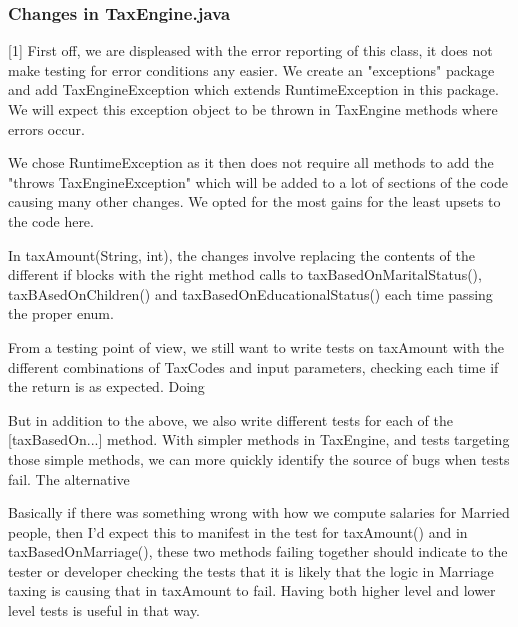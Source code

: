 \documentclass[11pt]{article}
\begin{document}
\subsubsection{Changes in TaxEngine.java}

[1] First off, we are displeased with the error reporting of this class, it does not make testing for error conditions any easier. We create an "exceptions" package and add TaxEngineException which extends RuntimeException in this package. We will expect this exception object to be thrown in TaxEngine methods where errors occur. 

We chose RuntimeException as it then does not require all methods to add the "throws TaxEngineException" which will be added to a lot of sections of the code causing many other changes. We opted for the most gains for the least upsets to the code here. 


In taxAmount(String, int), the changes involve replacing the contents of the different if blocks with the right method calls to taxBasedOnMaritalStatus(), taxBAsedOnChildren() and taxBasedOnEducationalStatus() each time passing the proper enum. 

From a testing point of view, we still want to write tests on taxAmount with the different combinations of TaxCodes and input parameters, checking each time if the return is as expected. Doing  

But in addition to the above, we also write different tests for each of the [taxBasedOn...] method. With simpler methods in TaxEngine, and tests targeting those simple methods, we can more quickly identify the source of bugs when tests fail. The alternative 

Basically if there was something wrong with how we compute salaries for Married people, then I'd expect this to manifest in the test for taxAmount() and
in taxBasedOnMarriage(), these two methods failing together should indicate to the tester or developer checking the tests that it is likely that the logic
in Marriage taxing is causing that in taxAmount to fail. Having both higher level and lower level tests is useful in that way. 
\end{document}
